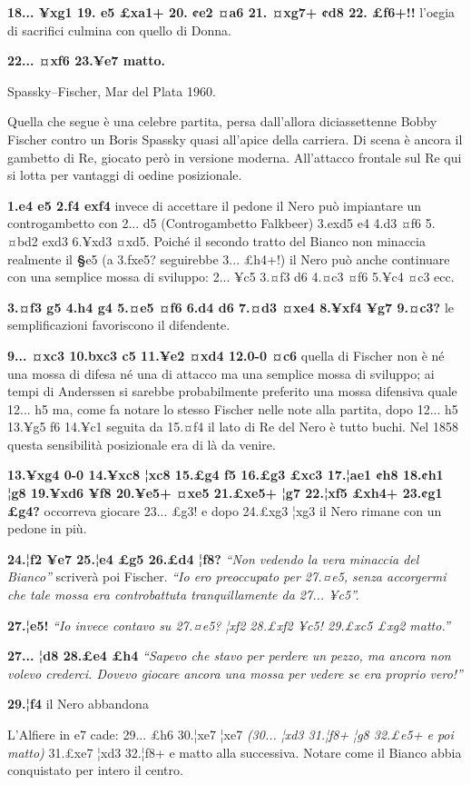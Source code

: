 \textbf{18... ¥xg1 19. e5 £xa1+ 20. ¢e2 ¤a6 21. ¤xg7+ ¢d8 22. £f6+!!}
l'o¢gia di sacrifici culmina con quello di Donna.

\textbf{22... ¤xf6 23.¥e7 matto.}

Spassky--Fischer, Mar del Plata 1960.

Quella che segue è una celebre partita, persa dall'allora diciassettenne
Bobby Fischer contro un Boris Spassky quasi all'apice della carriera. Di
scena è ancora il gambetto di Re, giocato però in versione moderna.
All'attacco frontale sul Re qui si lotta per vantaggi di o¢dine
posizionale.

\textbf{1.e4 e5 2.f4 exf4} invece di accettare il pedone il Nero può
impiantare un controgambetto con 2... d5 (Controgambetto Falkbeer)
3.exd5 e4 4.d3 ¤f6 5.¤bd2 exd3 6.¥xd3 ¤xd5. Poiché il secondo tratto del
Bianco non minaccia realmente il \textbf{§}e5 (a 3.fxe5? seguirebbe 3...
£h4+!) il Nero può anche continuare con una semplice mossa di sviluppo:
2... ¥c5 3.¤f3 d6 4.¤c3 ¤f6 5.¥c4 ¤c3 ecc.

\textbf{3.¤f3 g5 4.h4 g4 5.¤e5 ¤f6 6.d4 d6 7.¤d3 ¤xe4 8.¥xf4 ¥g7 9.¤c3?}
le semplificazioni favoriscono il difendente.

\textbf{9... ¤xc3 10.bxc3 c5 11.¥e2 ¤xd4 12.0-0 ¤c6} quella di Fischer
non è né una mossa di difesa né una di attacco ma una semplice mossa di
sviluppo; ai tempi di Anderssen si sarebbe probabilmente preferito una
mossa difensiva quale 12... h5 ma, come fa notare lo stesso Fischer
nelle note alla partita, dopo 12... h5 13.¥g5 f6 14.¥c1 seguita da
15.¤f4 il lato di Re del Nero è tutto buchi. Nel 1858 questa sensibilità
posizionale era di là da venire.

\textbf{13.¥xg4 0-0 14.¥xc8 ¦xc8 15.£g4 f5 16.£g3 £xc3 17.¦ae1 ¢h8
18.¢h1 ¦g8 19.¥xd6 ¥f8 20.¥e5+ ¤xe5 21.£xe5+ ¦g7 22.¦xf5 £xh4+ 23.¢g1
£g4?} occorreva giocare 23... £g3! e dopo 24.£xg3 ¦xg3 il Nero rimane
con un pedone in più.

\textbf{24.¦f2 ¥e7 25.¦e4 £g5 26.£d4 ¦f8?} \emph{``Non vedendo la vera
minaccia del Bianco''} scriverà poi Fischer. \emph{``Io ero preoccupato
per 27.¤e5, senza accorgermi che tale mossa era controbattuta
tranquillamente da 27... ¥c5''.}

\textbf{27.¦e5!} \emph{``Io invece contavo su 27.¤e5? ¦xf2 28.£xf2 ¥c5!
29.£xc5 £xg2 matto.''}

\textbf{27... ¦d8 28.£e4 £h4} \emph{``Sapevo che stavo per perdere un
pezzo, ma ancora non volevo crederci. Dovevo giocare ancora una mossa
per vedere se era proprio vero!''}

\textbf{29.¦f4} il Nero abbandona


L'Alfiere in e7 cade: 29... £h6 30.¦xe7 ¦xe7 \emph{(30... ¦xd3 31.¦f8+
¦g8 32.£e5+ e poi matto)} 31.£xe7 ¦xd3 32.¦f8+ e matto alla successiva.
Notare come il Bianco abbia conquistato per intero il centro.

